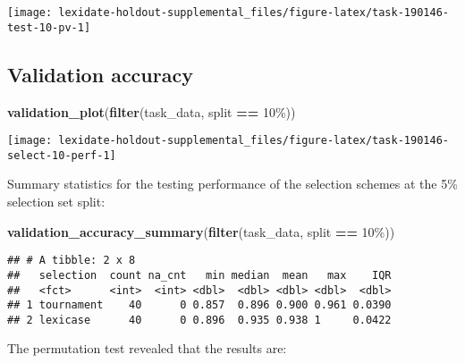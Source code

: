 \documentclass[
]{book}
\newenvironment{Shaded}{\begin{snugshade}}{\end{snugshade}}
\newcommand{\FunctionTok}[1]{\textcolor[rgb]{0.13,0.29,0.53}{\textbf{#1}}}
\newcommand{\NormalTok}[1]{#1}
\newcommand{\SpecialCharTok}[1]{\textcolor[rgb]{0.81,0.36,0.00}{\textbf{#1}}}
\newcommand{\StringTok}[1]{\textcolor[rgb]{0.31,0.60,0.02}{#1}}
\begin{document}
\texttt{[image: lexidate-holdout-supplemental\_files/figure-latex/task-190146-test-10-pv-1]}

\hypertarget{validation-accuracy-16}{%
\subsection{Validation accuracy}\label{validation-accuracy-16}}

\begin{Shaded}
\begin{Highlighting}[]
\FunctionTok{validation\_plot}\NormalTok{(}\FunctionTok{filter}\NormalTok{(task\_data, split }\SpecialCharTok{==} \StringTok{\textquotesingle{}10\%\textquotesingle{}}\NormalTok{))}
\end{Highlighting}
\end{Shaded}

\texttt{[image: lexidate-holdout-supplemental\_files/figure-latex/task-190146-select-10-perf-1]}

Summary statistics for the testing performance of the selection schemes at the 5\% selection set split:

\begin{Shaded}
\begin{Highlighting}[]
\FunctionTok{validation\_accuracy\_summary}\NormalTok{(}\FunctionTok{filter}\NormalTok{(task\_data, split }\SpecialCharTok{==} \StringTok{\textquotesingle{}10\%\textquotesingle{}}\NormalTok{))}
\end{Highlighting}
\end{Shaded}

\begin{verbatim}
## # A tibble: 2 x 8
##   selection  count na_cnt   min median  mean   max    IQR
##   <fct>      <int>  <int> <dbl>  <dbl> <dbl> <dbl>  <dbl>
## 1 tournament    40      0 0.857  0.896 0.900 0.961 0.0390
## 2 lexicase      40      0 0.896  0.935 0.938 1     0.0422
\end{verbatim}

The permutation test revealed that the results are:
\end{document}
